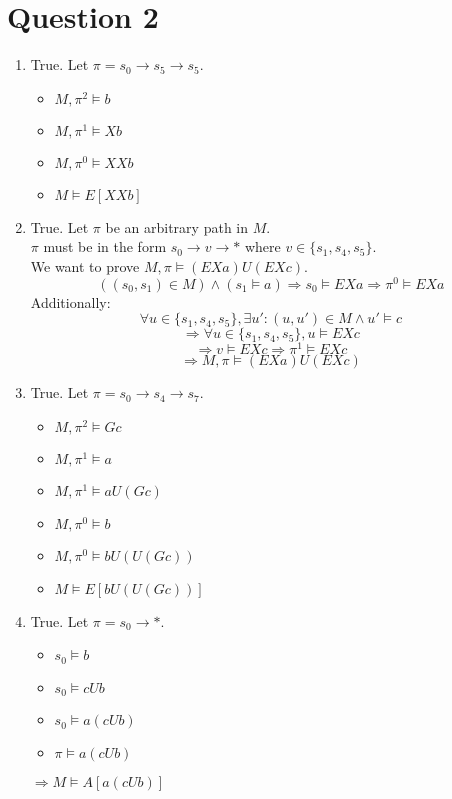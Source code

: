 \documentclass{article}
\begin{document}
\section*{Question 2}
\begin{enumerate}
    \item True. Let $\pi=s_0\rightarrow s_5\rightarrow s_5$.
        \begin{itemize}
            \item $M,\pi^2\models b$
            \item $M,\pi^1\models Xb$
            \item $M,\pi^0\models XXb$
            \item $M\models E[XXb]$
        \end{itemize}
    \item True. Let $\pi$ be an arbitrary path in $M$.\\
        $\pi$ must be in the form $s_0\rightarrow v\rightarrow *$
        where $v\in\{s_1,s_4,s_5\}$.\\
        We want to prove $M,\pi\models (EXa)U(EXc)$.\\
        \[\left((s_0,s_1)\in M\right)\wedge\left(s_1\models a\right)\Rightarrow s_0\models EXa\Rightarrow \pi^0\models EXa\]
        Additionally:
        \[\forall u\in\{s_1,s_4,s_5\}, \exists u':(u,u')\in M\wedge u'\models c\]
        \[\Rightarrow \forall u\in\{s_1,s_4,s_5\}, u\models EXc\]
        \[\Rightarrow v\models EXc\Rightarrow \pi^1\models EXc\]
        \[\Rightarrow M,\pi\models (EXa)U(EXc)\]
    \item True. Let $\pi=s_0\rightarrow s_4\rightarrow s_7$.
        \begin{itemize}
            \item $M,\pi^2\models Gc$
            \item $M,\pi^1\models a$
            \item $M,\pi^1\models aU(Gc)$
            \item $M,\pi^0\models b$
            \item $M,\pi^0\models bU(U(Gc))$
            \item $M\models E[bU(U(Gc))]$
        \end{itemize}
    \item True. Let $\pi=s_0\rightarrow *$.\\
        \begin{itemize}
            \item $s_0\models b$
            \item $s_0\models cUb$
            \item $s_0\models a(cUb)$
            \item $\pi\models a(cUb)$
        \end{itemize}
        $\Rightarrow M\models A[a(cUb)]$
\end{enumerate}
\end{document}
